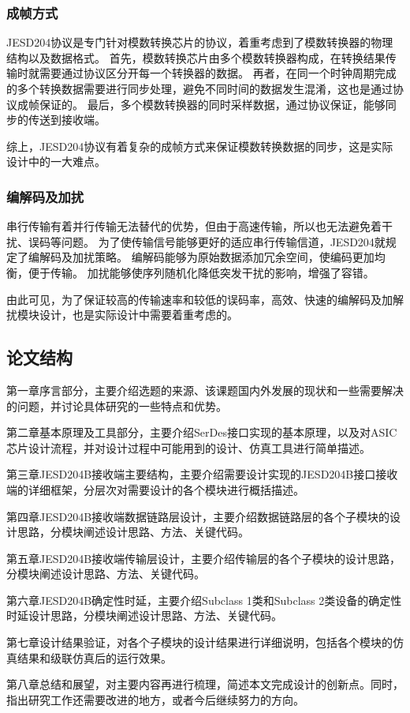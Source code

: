 \documentclass[UTF8]{ctexart}
\begin{document}
\subsubsection{成帧方式}

JESD204协议是专门针对模数转换芯片的协议，着重考虑到了模数转换器的物理结构以及数据格式。
首先，模数转换芯片由多个模数转换器构成，在转换结果传输时就需要通过协议区分开每一个转换器的数据。
再者，在同一个时钟周期完成的多个转换数据需要进行同步处理，避免不同时间的数据发生混淆，这也是通过协议成帧保证的。
最后，多个模数转换器的同时采样数据，通过协议保证，能够同步的传送到接收端。

综上，JESD204协议有着复杂的成帧方式来保证模数转换数据的同步，这是实际设计中的一大难点。

\subsubsection{编解码及加扰}

串行传输有着并行传输无法替代的优势，但由于高速传输，所以也无法避免着干扰、误码等问题。
为了使传输信号能够更好的适应串行传输信道，JESD204就规定了编解码及加扰策略。
编解码能够为原始数据添加冗余空间，使编码更加均衡，便于传输。
加扰能够使序列随机化降低突发干扰的影响，增强了容错。

由此可见，为了保证较高的传输速率和较低的误码率，高效、快速的编解码及加解扰模块设计，也是实际设计中需要着重考虑的。

\subsection{论文结构}

第一章序言部分，主要介绍选题的来源、该课题国内外发展的现状和一些需要解决的问题，并讨论具体研究的一些特点和优势。

第二章基本原理及工具部分，主要介绍SerDes接口实现的基本原理，以及对ASIC芯片设计流程，并对设计过程中可能用到的设计、仿真工具进行简单描述。

第三章JESD204B接收端主要结构，主要介绍需要设计实现的JESD204B接口接收端的详细框架，分层次对需要设计的各个模块进行概括描述。

第四章JESD204B接收端数据链路层设计，主要介绍数据链路层的各个子模块的设计思路，分模块阐述设计思路、方法、关键代码。

第五章JESD204B接收端传输层设计，主要介绍传输层的各个子模块的设计思路，分模块阐述设计思路、方法、关键代码。

第六章JESD204B确定性时延，主要介绍Subclass 1类和Subclass 2类设备的确定性时延设计思路，分模块阐述设计思路、方法、关键代码。

第七章设计结果验证，对各个子模块的设计结果进行详细说明，包括各个模块的仿真结果和级联仿真后的运行效果。

第八章总结和展望，对主要内容再进行梳理，简述本文完成设计的创新点。同时，指出研究工作还需要改进的地方，或者今后继续努力的方向。


\end{document}

